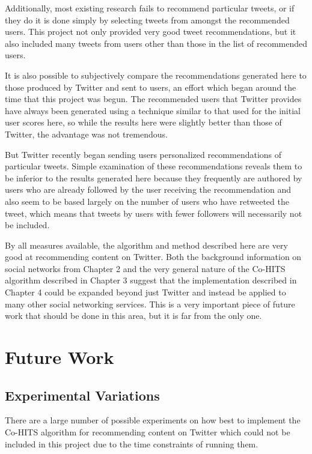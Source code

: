 Additionally, most existing research fails to recommend particular tweets, or if they do it is done simply by selecting tweets from amongst the recommended users. This project not only provided very good tweet recommendations, but it also included many tweets from users other than those in the list of recommended users.

It is also possible to subjectively compare the recommendations generated here to those produced by Twitter and sent to users, an effort which began around the time that this project was begun. The recommended users that Twitter provides have always been generated using a technique similar to that used for the initial user scores here, so while the results here were slightly better than those of Twitter, the advantage was not tremendous.

But Twitter recently began sending users personalized recommendations of particular tweets. Simple examination of these recommendations reveals them to be inferior to the results generated here because they frequently are authored by users who are already followed by the user receiving the recommendation and also seem to be based largely on the number of users who have retweeted the tweet, which means that tweets by users with fewer followers will necessarily not be included.

By all measures available, the algorithm and method described here are very good at recommending content on Twitter. Both the background information on social networks from Chapter 2 and the very general nature of the Co-HITS algorithm described in Chapter 3 suggest that the implementation described in Chapter 4 could be expanded beyond just Twitter and instead be applied to many other social networking services. This is a very important piece of future work that should be done in this area, but it is far from the only one.


\section{Future Work}

\subsection{Experimental Variations}

There are a large number of possible experiments on how best to implement the Co-HITS algorithm for recommending content on Twitter which could not be included in this project due to the time constraints of running them.

